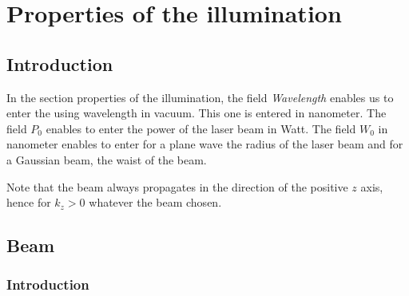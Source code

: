 \chapter{Properties of the illumination }\label{chap3}

\minitoc

\section{Introduction}

In the section properties of the illumination, the field {\it
  Wavelength} enables us to enter the using wavelength in vacuum. This
one is entered in nanometer. The field $P_0$ enables to enter the
power of the laser beam in Watt. The field $W_0$ in nanometer enables
to enter for a plane wave the radius of the laser beam and for a
Gaussian beam, the waist of the beam.

Note that the beam always propagates in the direction of the positive
$z$ axis, hence for $k_z>0$ whatever the beam chosen.

\section{Beam}

\subsection{Introduction}

